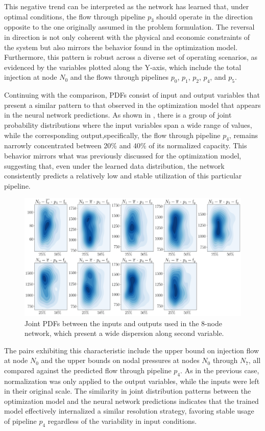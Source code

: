 This negative trend can be interpreted as the network has learned that, under optimal conditions, the flow through pipeline $p_3$ should operate in the direction opposite to the one originally assumed in the problem formulation. The reversal in direction is not only coherent with the physical and economic constraints of the system but also mirrors the behavior found in the optimization model. Furthermore, this pattern is robust across a diverse set of operating scenarios, as evidenced by the variables plotted along the Y-axis, which include the total injection at node $N_0$ and the flows through pipelines $p_0$, $p_1$, $p_2$, $p_4$, and $p_5$. 


Continuing with the comparison, PDFs consist of input and output variables that present a similar pattern to that observed in the optimization model that appears in the neural network predictions. As shown in , there is a group of joint probability distributions where the input variables span a wide range of values, while the corresponding output,specifically, the flow through pipeline $p_4$, remains narrowly concentrated between 20\% and 40\% of its normalized capacity. This behavior mirrors what was previously discussed for the optimization model, suggesting that, even under the learned data distribution, the network consistently predicts a relatively low and stable utilization of this particular pipeline.

\begin{figure}[htbp]
    \begin{center}
        \includegraphics[width=.7\textwidth]{figures/Chapter_NonLinealCensnet/inputs_outputs_1 KDE.png}
    \end{center}
    \caption{Joint PDFs between the inputs and outputs used in the 8-node network, which present a wide dispersion along second variable. }
    \label{fig:joint_distributions_inputs_outputs_1_KDE}
\end{figure}


The pairs exhibiting this characteristic include the upper bound on injection flow at node $N_0$ and the upper bounds on nodal pressures at nodes $N_0$ through $N_7$, all compared against the predicted flow through pipeline $p_4$. As in the previous case, normalization was only applied to the output variables, while the inputs were left in their original scale. The similarity in joint distribution patterns between the optimization model and the neural network predictions indicates that the trained model effectively internalized a similar resolution strategy, favoring stable usage of pipeline $p_4$ regardless of the variability in input conditions.


